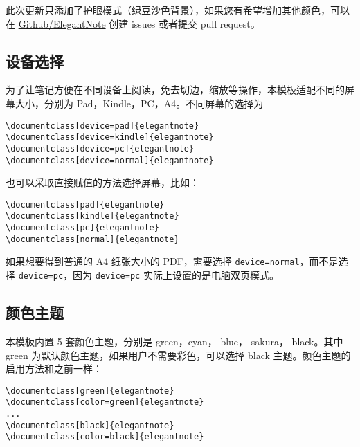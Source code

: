 \documentclass[cn,normal,12pt]{../elegantnote}
\begin{document}
\begin{remark}
此次更新只添加了护眼模式（绿豆沙色背景），如果您有希望增加其他颜色，可以在 \href{https://github.com/ElegantLaTeX/ElegantNote}{Github/ElegantNote} 创建 issues 或者提交 pull request。
\end{remark}

\subsection{设备选择}
为了让笔记方便在不同设备上阅读，免去切边，缩放等操作，本模板适配不同的屏幕大小，分别为 Pad，Kindle，PC，A4。不同屏幕的选择为
\begin{lstlisting}[frame=none]  
\documentclass[device=pad]{elegantnote}
\documentclass[device=kindle]{elegantnote}
\documentclass[device=pc]{elegantnote}
\documentclass[device=normal]{elegantnote}
\end{lstlisting}
\begin{note}
也可以采取直接赋值的方法选择屏幕，比如：
\end{note}
\begin{lstlisting}[frame=none]  
\documentclass[pad]{elegantnote}
\documentclass[kindle]{elegantnote}
\documentclass[pc]{elegantnote}
\documentclass[normal]{elegantnote}
\end{lstlisting}

\begin{note}
如果想要得到普通的 A4 纸张大小的 PDF，需要选择 \lstinline{device=normal}，而不是选择 \lstinline{device=pc}，因为  \lstinline{device=pc} 实际上设置的是电脑双页模式。
\end{note}

\subsection{颜色主题}
本模板内置 5 套颜色主题，分别是 \textcolor{egreen}{green}，\textcolor{ecyan}{cyan}， \textcolor{eblue}{blue}， \textcolor{sakura}{sakura}， \textcolor{black}{black}。其中 green 为默认颜色主题，如果用户不需要彩色，可以选择 black 主题。颜色主题的启用方法和之前一样：
\begin{lstlisting}[frame=none]  
\documentclass[green]{elegantnote}
\documentclass[color=green]{elegantnote}
...
\documentclass[black]{elegantnote}
\documentclass[color=black]{elegantnote}
\end{lstlisting}
\end{document}
